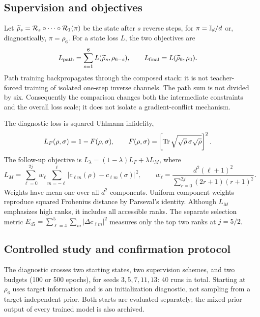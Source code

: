\subsection{Supervision and objectives}
Let $\widetilde\rho_s=\mathcal{R}_s\circ\cdots\circ\mathcal{R}_1(\pi)$ be the state after $s$ reverse steps, for $\pi=\mathbb{I}_d/d$ or, diagnostically, $\pi=\rho_6$. For a state loss $L$, the two objectives are
\begin{equation}
 L_{\rm path}=\sum_{s=1}^{6}L(\widetilde\rho_s,\rho_{6-s}),\qquad
 L_{\rm final}=L(\widetilde\rho_6,\rho_0).
 \label{eq:supervision}
\end{equation}
Path training backpropagates through the composed stack: it is not teacher-forced training of isolated one-step inverse channels. The path sum is not divided by six. Consequently the comparison changes both the intermediate constraints and the overall loss scale; it does not isolate a gradient-conflict mechanism.

The diagnostic loss is squared-Uhlmann infidelity,
\begin{equation}
 L_F(\rho,\sigma)=1-F(\rho,\sigma),\qquad
 F(\rho,\sigma)=\left[\operatorname{Tr}\sqrt{\sqrt\rho\,\sigma\sqrt\rho}\right]^2.
\end{equation}
The follow-up objective is $L_\lambda=(1-\lambda)L_F+\lambda L_M$, where
\begin{equation}
 L_M=\sum_{\ell=0}^{2j}w_\ell\sum_{m=-\ell}^{\ell}
 |c_{\ell m}(\rho)-c_{\ell m}(\sigma)|^2,\qquad
 w_\ell=\frac{d^2(\ell+1)^2}{\sum_{r=0}^{2j}(2r+1)(r+1)^2}.
 \label{eq:hybrid}
\end{equation}
Weights have mean one over all $d^2$ components. Uniform component weights reproduce squared Frobenius distance by Parseval's identity. Although $L_M$ emphasizes high ranks, it includes all accessible ranks. The separate selection metric $E_{45}=\sum_{\ell=4}^{5}\sum_m|\Delta c_{\ell m}|^2$ measures only the top two ranks at $j=5/2$.

\subsection{Controlled study and confirmation protocol}
The diagnostic crosses two starting states, two supervision schemes, and two budgets (100 or 500 epochs), for seeds $3,5,7,11,13$: 40 runs in total. Starting at $\rho_6$ uses target information and is an initialization diagnostic, not sampling from a target-independent prior. Both starts are evaluated separately; the mixed-prior output of every trained model is also archived.

